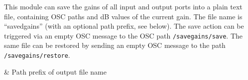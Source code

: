 This module can save the gains of all input and output ports into a
plain text file, containing OSC paths and dB values of the current
gain.
%
The file name is ``savedgains'' (with an optional path prefix, see below).
%
The save action can be triggered via an empty OSC message to the OSC
path \verb!/savegains/save!.
%
The same file can be restored by sending an empty OSC message to the
path \verb!/savegains/restore!.

\begin{tscattributes}
 & Path prefix of output file name \\
\end{tscattributes}
